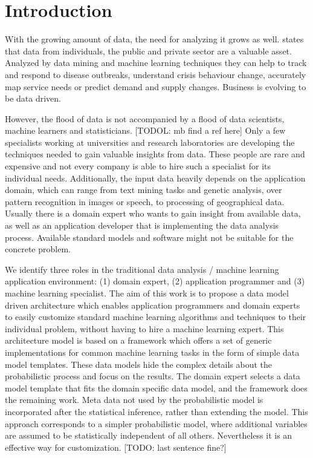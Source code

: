 \section{Introduction}

With the growing amount of data, the need for analyzing it grows as well. \textcite{forum2012bigdata} states that data from individuals, the public and private sector are a valuable asset. Analyzed by data mining and machine learning techniques they can help to track and respond to disease outbreaks, understand crisis behaviour change, accurately map service needs or predict demand and supply changes. Business is evolving to be data driven.

However, the flood of data is not accompanied by a flood of data scientists, machine learners and statisticians. [TODOL: mb find a ref here] Only a few specialists working at universities and research laboratories are developing the techniques needed to gain valuable insights from data. These people are rare and expensive and not every company is able to hire such a specialist for its individual needs. Additionally, the input data heavily depends on the application domain, which can range from text mining tasks and genetic analysis, over pattern recognition in images or speech, to processing of geographical data. Usually there is a domain expert who wants to gain insight from available data, as well as an application developer that is implementing the data analysis process. Available standard models and software might not be suitable for the concrete problem.

We identify three roles in the traditional data analysis / machine learning application environment: (1) domain expert, (2) application programmer and (3) machine learning specialist. The aim of this work is to propose a data model driven architecture which enables application programmers and domain experts to easily customize standard machine learning algorithms and techniques to their individual problem, without having to hire a machine learning expert. This architecture model is based on a framework which offers a set of generic implementations for common machine learning tasks in the form of simple data model templates. These data models hide the complex details about the probabilistic process and focus on the results. The domain expert selects a data model template that fits the domain specific data model, and the framework does the remaining work. Meta data not used by the probabilistic model is incorporated after the statistical inference, rather than extending the model. This approach corresponds to a simpler probabilistic model, where additional variables are assumed to be statistically independent of all others. Nevertheless it is an effective way for customization. [TODO: last sentence fine?]


